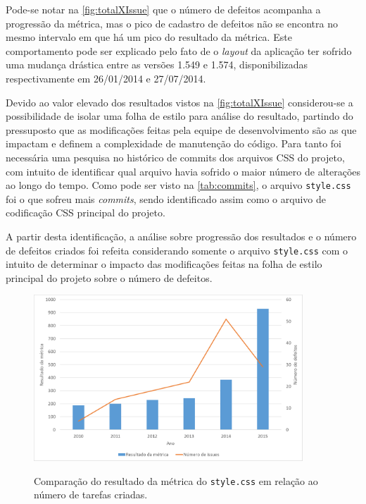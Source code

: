 Pode-se notar na \autoref{fig:totalXIssue} que o número de defeitos acompanha a progressão da métrica, mas o pico de cadastro de defeitos não se encontra no mesmo intervalo em que há um pico do resultado da métrica. Este comportamento pode ser explicado pelo fato de o \textit{layout} da aplicação ter sofrido uma mudança drástica entre as versões 1.549 e 1.574, disponibilizadas respectivamente em 26/01/2014 e 27/07/2014.

Devido ao valor elevado dos resultados vistos na \autoref{fig:totalXIssue} considerou-se a possibilidade de isolar uma folha de estilo para análise do resultado, partindo do pressuposto que as modificações feitas pela equipe de desenvolvimento são as que impactam e definem a complexidade de manutenção do código. Para tanto foi necessária uma pesquisa no histórico de commits dos arquivos CSS do projeto, com intuito de identificar qual arquivo havia sofrido o maior número de alterações ao longo do tempo. Como pode ser visto na \autoref{tab:commits}, o arquivo \texttt{style.css} foi o que sofreu mais \textit{commits}, sendo identificado assim como o arquivo de codificação CSS principal do projeto.



A partir desta identificação, a análise sobre progressão dos resultados e o número de defeitos criados foi refeita considerando somente o arquivo \texttt{style.css} com o intuito de determinar o impacto das modificações feitas na folha de estilo principal do projeto sobre o número de defeitos.

\begin{figure}[!htbp]
	\centering
	\caption{Comparação do resultado da métrica do \texttt{style.css} em relação ao número de tarefas criadas.}
	\includegraphics[width=0.9\textwidth]{./04-figuras/style_issues}
	\label{fig:styleXIssues}
\end{figure}

